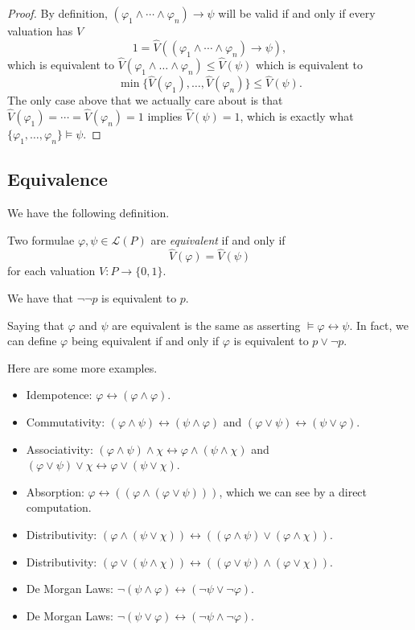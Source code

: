 \documentclass[../notes.tex]{subfiles}
\begin{document}
\begin{proof}
	By definition, $(\varphi_1\land\cdots\land\varphi_n)\to\psi$ will be valid if and only if every valuation has $V$
	\[1=\hat V((\varphi_1\land\cdots\land\varphi_n)\to\psi),\]
	which is equivalent to $\hat V(\varphi_1\land\dots\land\varphi_n)\le\hat V(\psi)$ which is equivalent to
	\[\min\{\hat V(\varphi_1),\ldots,\hat V(\varphi_n)\}\le\hat V(\psi).\]
	The only case above that we actually care about is that $\hat V(\varphi_1)=\cdots=\hat V(\varphi_n)=1$ implies $\hat V(\psi)=1$, which is exactly what $\{\varphi_1,\ldots,\varphi_n\}\models\psi$.
\end{proof}

\subsection{Equivalence}
We have the following definition.
\begin{definition}[Equivalence]
	Two formulae $\varphi,\psi\in\mathcal L(P)$ are \textit{equivalent} if and only if
	\[\hat V(\varphi)=\hat V(\psi)\]
	for each valuation $V:P\to\{0,1\}$.
\end{definition}
\begin{example}
	We have that $\lnot\lnot p$ is equivalent to $p$.
\end{example}
\begin{remark}
	Saying that $\varphi$ and $\psi$ are equivalent is the same as asserting $\models\varphi\leftrightarrow\psi$. In fact, we can define $\varphi$ being equivalent if and only if $\varphi$ is equivalent to $p\lor\lnot p$.
\end{remark}
Here are some more examples.
\begin{itemize}
	\item Idempotence: $\varphi\leftrightarrow(\varphi\land\varphi)$.
	\item Commutativity: $(\varphi\land\psi)\leftrightarrow(\psi\land\varphi)$ and $(\varphi\lor\psi)\leftrightarrow(\psi\lor\varphi)$.
	\item Associativity: $(\varphi\land\psi)\land\chi\leftrightarrow\varphi\land(\psi\land\chi)$ and $(\varphi\lor\psi)\lor\chi\leftrightarrow\varphi\lor(\psi\lor\chi)$.
	\item Absorption: $\varphi\leftrightarrow((\varphi\land(\varphi\lor\psi)))$, which we can see by a direct computation.
	\item Distributivity: $(\varphi\land(\psi\lor\chi))\leftrightarrow((\varphi\land\psi)\lor(\varphi\land\chi))$.
	\item Distributivity: $(\varphi\lor(\psi\land\chi))\leftrightarrow((\varphi\lor\psi)\land(\varphi\lor\chi))$.
	\item De Morgan Laws: $\lnot(\psi\land\varphi)\leftrightarrow(\lnot\psi\lor\lnot\varphi)$.
	\item De Morgan Laws: $\lnot(\psi\lor\varphi)\leftrightarrow(\lnot\psi\land\lnot\varphi)$.
\end{itemize}
\end{document}
